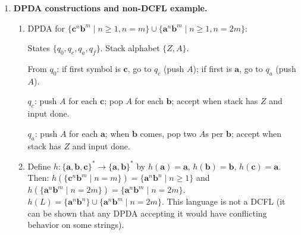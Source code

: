 \begin{enumerate}[{10.}1. ]
\begin{enumerate}
The grammar $G$:
\[
S \;\to\; \pmb{c}S \;\mid\; SS \;\mid\; \pmb{a}S\pmb{b} \;\mid\; \pmb{b}S\pmb{a} \;\mid\; \lambda
\]
generates exactly $\{x\in\{\pmb{a},\pmb{b},\pmb{c}\}^*\mid |x|_{\pmb{a}}=|x|_{\pmb{b}}\}$: every production that introduces an $\pmb{a}$ also introduces a $\pmb{b}$ (and vice versa), while $\pmb{c}$-steps and concatenation preserve balance.

\textit{Note}: The exercise may have intended the language $\{x\mid|x|_{\pmb{a}}=|x|_{\pmb{b}}=|x|_{\pmb{c}}\}$, which \emph{is} not CFL. The proof for that language follows the hint: if $\{x\mid|x|_{\pmb{a}}=|x|_{\pmb{b}}=|x|_{\pmb{c}}\}$ were CFL, intersect with the regular language $\pmb{a}^*\pmb{b}^*\pmb{c}^*$ (closure of CFL under intersection with regular languages) to obtain $\{\pmb{a}^n\pmb{b}^n\pmb{c}^n\mid n\geq 0\}$, which would then be CFL --- contradicting part~(a). \qed
\end{enumerate}

\item \textbf{DPDA constructions and non-DCFL example.}

\begin{enumerate}
\item DPDA for $\{\pmb{c}^n\pmb{b}^m \mid n\geq 1, n=m\} \cup \{\pmb{a}^n\pmb{b}^m \mid n\geq 1, n=2m\}$:

States $\{q_0,q_c,q_a,q_f\}$. Stack alphabet $\{Z,A\}$.

From $q_0$: if first symbol is $\pmb{c}$, go to $q_c$ (push $A$); if first is $\pmb{a}$, go to $q_a$ (push $A$).

$q_c$: push $A$ for each $\pmb{c}$; pop $A$ for each $\pmb{b}$; accept when stack has $Z$ and input done.

$q_a$: push $A$ for each $\pmb{a}$; when $\pmb{b}$ comes, pop two $A$s per $\pmb{b}$; accept when stack has $Z$ and input done.

\item Define $h: \{\pmb{a},\pmb{b},\pmb{c}\}^* \to \{\pmb{a},\pmb{b}\}^*$ by $h(\pmb{a})=\pmb{a}$, $h(\pmb{b})=\pmb{b}$, $h(\pmb{c})=\pmb{a}$. Then:
$h(\{\pmb{c}^n\pmb{b}^m\mid n=m\}) = \{\pmb{a}^n\pmb{b}^n\mid n\geq 1\}$ and $h(\{\pmb{a}^n\pmb{b}^m\mid n=2m\}) = \{\pmb{a}^n\pmb{b}^m\mid n=2m\}$.
$h(L) = \{\pmb{a}^n\pmb{b}^n\}\cup\{\pmb{a}^n\pmb{b}^m\mid n=2m\}$. This language is not a DCFL (it can be shown that any DPDA accepting it would have conflicting behavior on some strings).
\end{enumerate}


\end{enumerate}
